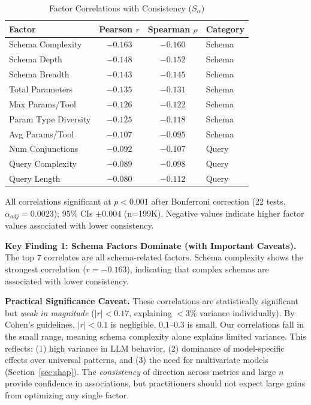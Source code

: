 \documentclass[sigconf,anonymous,review]{acmart}
\begin{document}
\begin{table}[t]
\centering
\caption{Factor Correlations with Consistency ($S_\alpha$)}
\label{tab:correlations}
\small
\begin{tabular}{@{}lccl@{}}
\toprule
\textbf{Factor} & \textbf{Pearson $r$} & \textbf{Spearman $\rho$} & \textbf{Category} \\
\midrule
Schema Complexity & $-0.163$ & $-0.160$ & Schema \\
Schema Depth & $-0.148$ & $-0.152$ & Schema \\
Schema Breadth & $-0.143$ & $-0.145$ & Schema \\
Total Parameters & $-0.135$ & $-0.131$ & Schema \\
Max Params/Tool & $-0.126$ & $-0.122$ & Schema \\
Param Type Diversity & $-0.125$ & $-0.118$ & Schema \\
Avg Params/Tool & $-0.107$ & $-0.095$ & Schema \\
Num Conjunctions & $-0.092$ & $-0.107$ & Query \\
Query Complexity & $-0.089$ & $-0.098$ & Query \\
Query Length & $-0.080$ & $-0.112$ & Query \\
\bottomrule
\end{tabular}
\vspace{0.5em}

\raggedright\footnotesize All correlations significant at $p < 0.001$ after Bonferroni correction (22 tests, $\alpha_{adj} = 0.0023$); 95\% CIs $\pm 0.004$ (n=199K). Negative values indicate higher factor values associated with lower consistency.
\end{table}

\textbf{Key Finding 1: Schema Factors Dominate (with Important Caveats).} The top 7 correlates are all schema-related factors. Schema complexity shows the strongest correlation ($r = -0.163$), indicating that complex schemas are associated with lower consistency.

\textbf{Practical Significance Caveat.} These correlations are statistically significant but \textit{weak in magnitude} ($|r| < 0.17$, explaining $<3\%$ variance individually). By Cohen's guidelines, $|r| < 0.1$ is negligible, $0.1$--$0.3$ is small. Our correlations fall in the small range, meaning schema complexity alone explains limited variance. This reflects: (1) high variance in LLM behavior, (2) dominance of model-specific effects over universal patterns, and (3) the need for multivariate models (Section~\ref{sec:shap}). The \textit{consistency} of direction across metrics and large $n$ provide confidence in associations, but practitioners should not expect large gains from optimizing any single factor.
\end{document}
